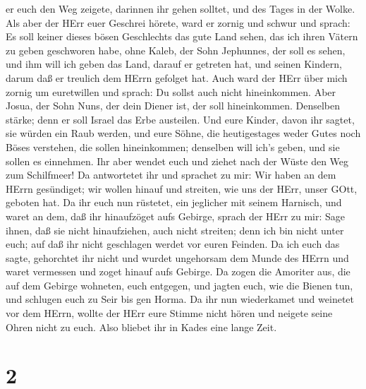 er euch den Weg zeigete, darinnen ihr gehen solltet, und des Tages in
der Wolke.  Als aber der HErr euer Geschrei hörete, ward er
zornig und schwur und sprach:  Es soll keiner dieses bösen
Geschlechts das gute Land sehen, das ich ihren Vätern zu geben
geschworen habe,  ohne Kaleb, der Sohn Jephunnes, der soll
es sehen, und ihm will ich geben das Land, darauf er getreten hat, und
seinen Kindern, darum daß er treulich dem HErrn gefolget hat.
 Auch ward der HErr über mich zornig um euretwillen und
sprach: Du sollst auch nicht hineinkommen.  Aber Josua, der
Sohn Nuns, der dein Diener ist, der soll hineinkommen. Denselben stärke;
denn er soll Israel das Erbe austeilen.  Und eure Kinder,
davon ihr sagtet, sie würden ein Raub werden, und eure Söhne, die
heutigestages weder Gutes noch Böses verstehen, die sollen hineinkommen;
denselben will ich's geben, und sie sollen es einnehmen. 
Ihr aber wendet euch und ziehet nach der Wüste den Weg zum Schilfmeer!
 Da antwortetet ihr und sprachet zu mir: Wir haben an dem
HErrn gesündiget; wir wollen hinauf und streiten, wie uns der HErr,
unser GOtt, geboten hat. Da ihr euch nun rüstetet, ein jeglicher mit
seinem Harnisch, und waret an dem, daß ihr hinaufzöget aufs Gebirge,
 sprach der HErr zu mir: Sage ihnen, daß sie nicht
hinaufziehen, auch nicht streiten; denn ich bin nicht unter euch; auf
daß ihr nicht geschlagen werdet vor euren Feinden.  Da ich
euch das sagte, gehorchtet ihr nicht und wurdet ungehorsam dem Munde des
HErrn und waret vermessen und zoget hinauf aufs Gebirge. 
Da zogen die Amoriter aus, die auf dem Gebirge wohneten, euch entgegen,
und jagten euch, wie die Bienen tun, und schlugen euch zu Seir bis gen
Horma.  Da ihr nun wiederkamet und weinetet vor dem HErrn,
wollte der HErr eure Stimme nicht hören und neigete seine Ohren nicht zu
euch.  Also bliebet ihr in Kades eine lange Zeit.

\hypertarget{section-1}{%
\section{2}\label{section-1}}

